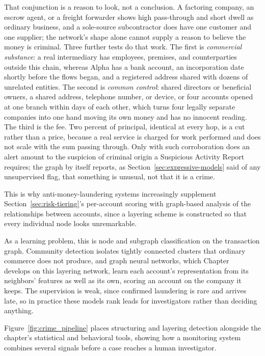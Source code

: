 \documentclass[../ai_in_finance]{subfiles}
\begin{document}
That conjunction is a reason to look, not a conclusion. A factoring company, an escrow agent, or a freight forwarder shows high pass-through and short dwell as ordinary business, and a sole-source subcontractor does have one customer and one supplier; the network's shape alone cannot supply a reason to believe the money is criminal. Three further tests do that work. The first is \emph{commercial substance}: a real intermediary has employees, premises, and counterparties outside this chain, whereas Alpha has a bank account, an incorporation date shortly before the flows began, and a registered address shared with dozens of unrelated entities. The second is \emph{common control}: shared directors or beneficial owners, a shared address, telephone number, or device, or four accounts opened at one branch within days of each other, which turns four legally separate companies into one hand moving its own money and has no innocent reading. The third is the fee. Two percent of principal, identical at every hop, is a cut rather than a price, because a real service is charged for work performed and does not scale with the sum passing through. Only with such corroboration does an alert amount to the suspicion of criminal origin a Suspicious Activity Report requires; the graph by itself reports, as Section~\ref{sec:expressive-models} said of any unsupervised flag, that something is unusual, not that it is a crime.

This is why anti-money-laundering systems increasingly supplement Section~\ref{sec:risk-tiering}'s per-account scoring with graph-based analysis of the relationships between accounts, since a layering scheme is constructed so that every individual node looks unremarkable.

As a learning problem, this is node and subgraph classification on the transaction graph. Community detection isolates tightly connected clusters that ordinary commerce does not produce, and graph neural networks, which Chapter~ develops on this layering network, learn each account's representation from its neighbors' features as well as its own, scoring an account on the company it keeps. The supervision is weak, since confirmed laundering is rare and arrives late, so in practice these models rank leads for investigators rather than deciding anything.

Figure~\ref{fig:crime_pipeline} places structuring and layering detection alongside the chapter's statistical and behavioral tools, showing how a monitoring system combines several signals before a case reaches a human investigator.
\end{document}
